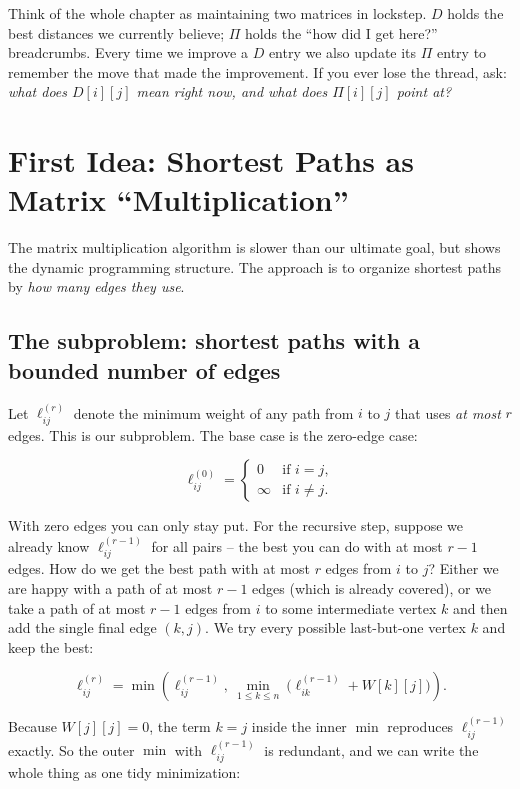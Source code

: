 \begin{intuitionbox}
Think of the whole chapter as maintaining two matrices in lockstep. $D$ holds the best distances we currently believe; $\Pi$ holds the
``how did I get here?'' breadcrumbs. Every time we improve a $D$ entry we also
update its $\Pi$ entry to remember the move that made the improvement. If you
ever lose the thread, ask: \emph{what does $D[i][j]$ mean right now, and what
does $\Pi[i][j]$ point at?}
\end{intuitionbox}

\section{First Idea: Shortest Paths as Matrix ``Multiplication''}
\label{ch25:matrix}

The matrix multiplication algorithm is slower than our ultimate goal, but shows the dynamic programming structure. The approach is to organize shortest paths by \emph{how many edges they use}.

\subsection{The subproblem: shortest paths with a bounded number of edges}

Let $\ell^{(r)}_{ij}$ denote the minimum weight of any path from $i$ to $j$
that uses \emph{at most} $r$ edges. This is our subproblem. The base case is
the zero-edge case:

\[
\ell^{(0)}_{ij} =
\begin{cases}
0 & \text{if } i = j,\\
\infty & \text{if } i \neq j.
\end{cases}
\]

With zero edges you can only stay put. For the recursive step, suppose we
already know $\ell^{(r-1)}_{ij}$ for all pairs -- the best you can do with at
most $r-1$ edges. How do we get the best path with at most $r$ edges from $i$
to $j$? Either we are happy with a path of at most $r-1$ edges (which is
already covered), or we take a path of at most $r-1$ edges from $i$ to some
intermediate vertex $k$ and then add the single final edge $(k, j)$. We try
every possible last-but-one vertex $k$ and keep the best:

\[
\ell^{(r)}_{ij}
= \min\left(\ell^{(r-1)}_{ij},\ \min_{1 \le k \le n}\ \big(\ell^{(r-1)}_{ik} + W[k][j]\big)\right).
\]

Because
$W[j][j] = 0$, the term $k = j$ inside the inner $\min$ reproduces
$\ell^{(r-1)}_{ij}$ exactly. So the outer $\min$ with $\ell^{(r-1)}_{ij}$ is
redundant, and we can write the whole thing as one tidy minimization:

